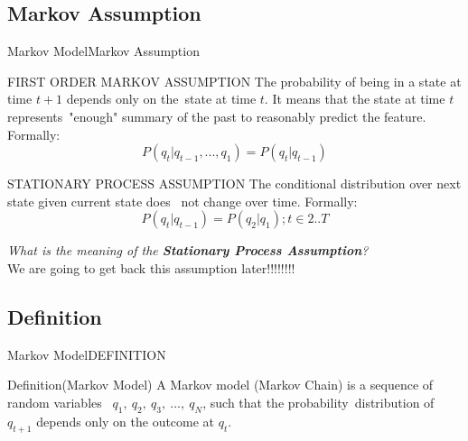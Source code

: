 \documentclass[10pt]{beamer}
\begin{document}
\subsection{Markov Assumption}
\begin{frame}{Markov Model}{Markov Assumption}
  \begin{block}{FIRST ORDER MARKOV ASSUMPTION}
        The probability of being in a state at time $t+1$ depends only on the\
        state at time $t$. It means that the state at time $t$ represents\
        "enough" summary of the past to reasonably predict the feature\cite{Daniel}. 
        Formally:\\
        \begin{equation}
            P(q_t|q_{t-1},...,q_1) = P(q_t|q_{t-1})
        \end{equation}
  \end{block}
  \begin{block}{STATIONARY PROCESS ASSUMPTION}
       The conditional distribution over next state given current state does \
       not change over time\cite{Daniel}. Formally:\\
        \begin{equation}
             P(q_t|q_{t-1}) = P(q_2|q_1);t \in 2..T
        \end{equation}
  \end{block}
  \textit{What is the meaning of the \textbf{Stationary Process Assumption}?}\\
  We are going to get back this assumption later!!!!!!!!
\end{frame}

\subsection{Definition}
\begin{frame}{Markov Model}{DEFINITION}
  \begin{block}{Definition(Markov Model)}
     A Markov model (Markov Chain) is a sequence of random variables \ 
     $q_1,\ q_2,\ q_3,\ ...,\ q_N$, such that the probability\
     distribution of $q_{t+1}$ depends only on the outcome at $q_t$.
  \end{block}
\end{frame}
\end{document}
